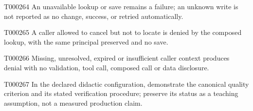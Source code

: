\documentclass[11pt,a4paper]{article}
\begin{document}
\begin{atlasparagraph}{T000264}
An unavailable lookup or save remains a failure; an unknown write is not reported as no change, success, or retried automatically.
\end{atlasparagraph}
\par{}\hypertarget{AC-BOOKING-CANCEL-CONTEXT}{}
\begin{atlasparagraph}{T000265}
A caller allowed to cancel but not to locate is denied by the composed lookup, with the same principal preserved and no save.
\end{atlasparagraph}
\par{}\hypertarget{AC-BOOKING-CANCEL-AUTH}{}
\begin{atlasparagraph}{T000266}
Missing, unresolved, expired or insufficient caller context produces denial with no validation, tool call, composed call or data disclosure.
\end{atlasparagraph}
\par{}\hypertarget{AC-BOOKING-CANCEL-QUALITY}{}
\begin{atlasparagraph}{T000267}
In the declared didactic configuration, demonstrate the canonical quality criterion and its stated verification procedure; preserve its status as a teaching assumption, not a measured production claim.
\end{atlasparagraph}
\par{}
\end{document}
